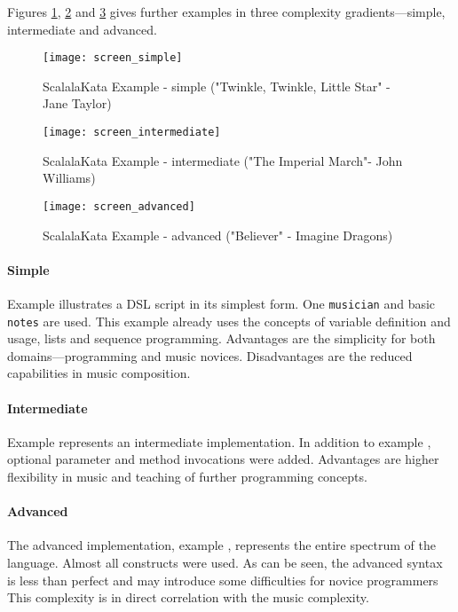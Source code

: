Figures \ref{IMG_SCREEN_S}, \ref{IMG_SCREEN_M} and \ref{IMG_SCREEN_L} gives further examples in three complexity gradients—simple, intermediate and advanced.

\begin{figure}[h]
\caption{ScalalaKata Example \textbf{} - simple ("Twinkle, Twinkle, Little Star" - Jane Taylor)}
\label{IMG_SCREEN_S}
\texttt{[image: screen\_simple]}
\end{figure}

\begin{figure}[h]
\caption{ScalalaKata Example \textbf{} - intermediate ("The Imperial March"- John Williams)}
\label{IMG_SCREEN_M}
\texttt{[image: screen\_intermediate]}
\end{figure}

\begin{figure}[h]
\caption{ScalalaKata Example \textbf{} - advanced ("Believer" - Imagine Dragons)}
\label{IMG_SCREEN_L}
\texttt{[image: screen\_advanced]}
\end{figure}

\paragraph{Simple}
Example \textbf{}  illustrates a DSL script in its simplest form. One \texttt{musician} and basic \texttt{notes} are used. This example already uses the concepts of variable definition and usage, lists and sequence programming. Advantages are the simplicity for both domains—programming and music novices. Disadvantages are the reduced capabilities in music composition.

\paragraph{Intermediate}
Example \textbf{} represents an intermediate implementation. In addition to example\textbf{  }, optional parameter and method invocations were added. Advantages are higher flexibility in music and teaching of further programming concepts.

\paragraph{Advanced}
The advanced implementation, example \textbf{}, represents the entire spectrum of the language. Almost all constructs were used. As can be seen, the advanced syntax is less than perfect and may introduce some difficulties for novice programmers This complexity is in direct correlation with the music complexity.

